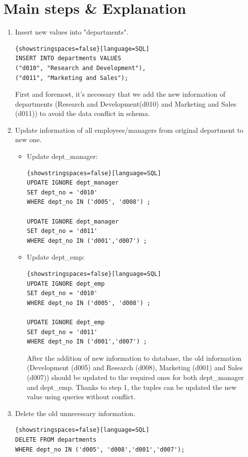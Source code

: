 \documentclass{article}
\begin{document}
\section*{Main steps \& Explanation}
\begin{enumerate}
	\item Insert new values into "departments". 
	\begin{lstlisting}{showstringspaces=false}[language=SQL]
INSERT INTO departments VALUES
("d010", "Research and Development"),
("d011", "Marketing and Sales");
	\end{lstlisting}
	First and foremost, it's necessary that we add the new information of departments (Research and
Development(d010) and Marketing and Sales (d011)) to avoid the data conflict in schema.

	\item Update information of all employees/managers from original department to new one.\\
	\begin{itemize}
		\item Update dept\_manager:
		\begin{lstlisting}{showstringspaces=false}[language=SQL]
UPDATE IGNORE dept_manager
SET dept_no = 'd010'
WHERE dept_no IN ('d005', 'd008') ;
	
UPDATE IGNORE dept_manager
SET dept_no = 'd011'
WHERE dept_no IN ('d001','d007') ;
	\end{lstlisting}
		\item Update dept\_emp:
		\begin{lstlisting}{showstringspaces=false}[language=SQL]
UPDATE IGNORE dept_emp
SET dept_no = 'd010'
WHERE dept_no IN ('d005', 'd008') ;
	
UPDATE IGNORE dept_emp
SET dept_no = 'd011'
WHERE dept_no IN ('d001','d007') ;
	\end{lstlisting}
	
After the addition of new information to database, the old information (Development (d005) and Research (d008), Marketing (d001) and Sales (d007)) should be updated to the required ones for both dept\_manager and dept\_emp. Thanks to step 1, the tuples can be updated the new value using queries without conflict. 

	\end{itemize}
	\item Delete the old unnecessary information.
	\begin{lstlisting}{showstringspaces=false}[language=SQL]
DELETE FROM departments 
WHERE dept_no IN ('d005', 'd008','d001','d007');
	\end{lstlisting}

\end{enumerate}
\end{document}
